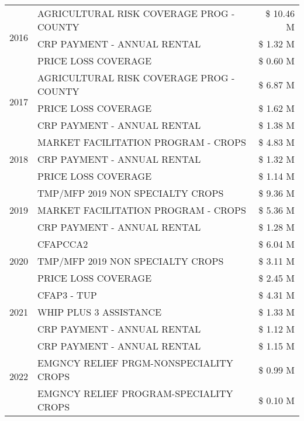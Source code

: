 \begin{tabular}{llr}
\cline{1-3}
\multirow[t]{3}{*}{2016} & AGRICULTURAL RISK COVERAGE PROG - COUNTY & \$ 10.46 M \\
 & CRP PAYMENT - ANNUAL RENTAL & \$ 1.32 M \\
 & PRICE LOSS COVERAGE & \$ 0.60 M \\
\cline{1-3}
\multirow[t]{3}{*}{2017} & AGRICULTURAL RISK COVERAGE PROG - COUNTY & \$ 6.87 M \\
 & PRICE LOSS COVERAGE & \$ 1.62 M \\
 & CRP PAYMENT - ANNUAL RENTAL & \$ 1.38 M \\
\cline{1-3}
\multirow[t]{3}{*}{2018} & MARKET FACILITATION PROGRAM - CROPS & \$ 4.83 M \\
 & CRP PAYMENT - ANNUAL RENTAL & \$ 1.32 M \\
 & PRICE LOSS COVERAGE & \$ 1.14 M \\
\cline{1-3}
\multirow[t]{3}{*}{2019} & TMP/MFP 2019 NON SPECIALTY CROPS & \$ 9.36 M \\
 & MARKET FACILITATION PROGRAM - CROPS & \$ 5.36 M \\
 & CRP PAYMENT - ANNUAL RENTAL & \$ 1.28 M \\
\cline{1-3}
\multirow[t]{3}{*}{2020} & CFAPCCA2 & \$ 6.04 M \\
 & TMP/MFP 2019 NON SPECIALTY CROPS & \$ 3.11 M \\
 & PRICE LOSS COVERAGE & \$ 2.45 M \\
\cline{1-3}
\multirow[t]{3}{*}{2021} & CFAP3 - TUP & \$ 4.31 M \\
 & WHIP PLUS 3 ASSISTANCE & \$ 1.33 M \\
 & CRP PAYMENT - ANNUAL RENTAL & \$ 1.12 M \\
\cline{1-3}
\multirow[t]{3}{*}{2022} & CRP PAYMENT - ANNUAL RENTAL & \$ 1.15 M \\
 & EMGNCY RELIEF PRGM-NONSPECIALITY CROPS & \$ 0.99 M \\
 & EMGNCY RELIEF PROGRAM-SPECIALITY CROPS & \$ 0.10 M \\
\cline{1-3}
\bottomrule
\end{tabular}
